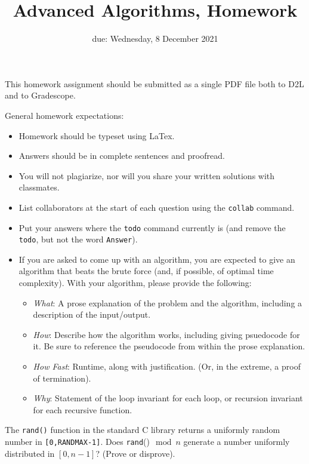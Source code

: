 \documentclass{article}
\title{Advanced Algorithms, Homework \hwnum}
\author{\todo{Your Name Here}}
\date{due: Wednesday, 8 December 2021}
\begin{document}
\maketitle

This homework assignment should be
submitted as a single PDF file both to D2L and to Gradescope.

General homework expectations:
\begin{itemize}
    \item Homework should be typeset using LaTex.
    \item Answers should be in complete sentences and proofread.
    \item You will not plagiarize, nor will you share your written solutions
        with classmates.
    \item List collaborators at the start of each question using the
        \texttt{collab} command.
    \item Put your answers where the \texttt{todo} command currently is (and
        remove the \texttt{todo}, but not the word \texttt{Answer}).
    \item If you are asked to come up with an algorithm, you are
        expected to give an algorithm that beats the brute force (and, if possible, of
        optimal time complexity). With your algorithm, please provide the following:
        \begin{itemize}
            \item \emph{What}: A prose explanation of the problem and the algorithm,
                including a description of the input/output.
            \item \emph{How}: Describe how the algorithm works, including giving
                psuedocode for it.  Be sure to reference the pseudocode
                from within the prose explanation.
            \item \emph{How Fast}: Runtime, along with justification.  (Or, in the
                extreme, a proof of termination).
            \item \emph{Why}: Statement of the loop invariant for each loop, or
                recursion invariant for each recursive function.
        \end{itemize}
\end{itemize}


\collab{\todo{}}
\nextprob{}

The \texttt{rand()} function in the standard C library returns a
uniformly random number in \texttt{[0,RANDMAX-1]}. Does \texttt{rand}()$\mod n$
generate a number uniformly distributed in $[0,n-1]$? (Prove or disprove).
\end{document}
